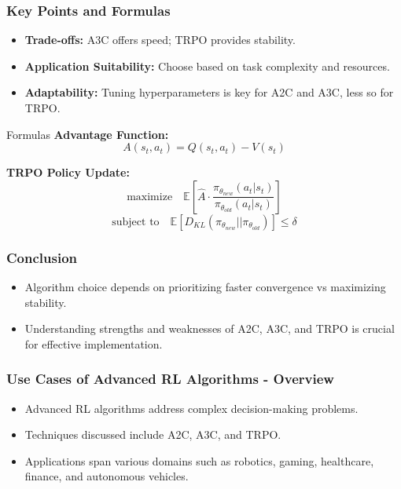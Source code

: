 \documentclass{beamer}
\begin{document}
\begin{frame}[fragile]
    \frametitle{Key Points and Formulas}
    \begin{itemize}
        \item \textbf{Trade-offs:} A3C offers speed; TRPO provides stability.
        \item \textbf{Application Suitability:} Choose based on task complexity and resources.
        \item \textbf{Adaptability:} Tuning hyperparameters is key for A2C and A3C, less so for TRPO.
    \end{itemize}

    \begin{block}{Formulas}
        \textbf{Advantage Function:}
        \begin{equation}
        A(s_t, a_t) = Q(s_t, a_t) - V(s_t)
        \end{equation}

        \textbf{TRPO Policy Update:}
        \begin{equation}
        \text{maximize} \quad \mathbb{E} \left[ \hat{A} \cdot \frac{\pi_{\theta_{new}}(a_t|s_t)}{\pi_{\theta_{old}}(a_t|s_t)} \right]
        \end{equation}
        \begin{equation}
        \text{subject to} \quad \mathbb{E} \left[ D_{KL}\left(\pi_{\theta_{new}} || \pi_{\theta_{old}}\right) \right] \leq \delta
        \end{equation}
    \end{block}
\end{frame}

\begin{frame}[fragile]
    \frametitle{Conclusion}
    \begin{itemize}
        \item Algorithm choice depends on prioritizing faster convergence vs maximizing stability.
        \item Understanding strengths and weaknesses of A2C, A3C, and TRPO is crucial for effective implementation.
    \end{itemize}
\end{frame}

\begin{frame}[fragile]
    \frametitle{Use Cases of Advanced RL Algorithms - Overview}
    \begin{itemize}
        \item Advanced RL algorithms address complex decision-making problems.
        \item Techniques discussed include A2C, A3C, and TRPO.
        \item Applications span various domains such as robotics, gaming, healthcare, finance, and autonomous vehicles.
    \end{itemize}
\end{frame}
\end{document}

